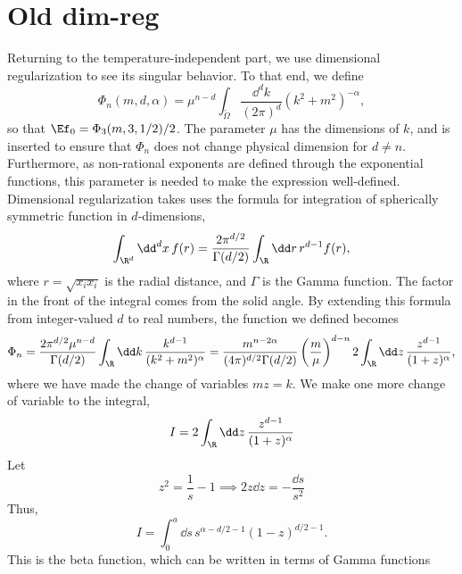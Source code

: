 \documentclass{article}
\begin{document}
\section{Old dim-reg}

Returning to the temperature-independent part, we use dimensional regularization to see its singular behavior.
To that end, we define
\begin{equation}
    \label{def dimreg integral}
    \Phi_n(m, d, \alpha) 
    = \mu^{n - d}\int_{\tilde \Omega} \frac{\dd^d k}{(2 \pi)^d} (k^2 + m^2)^{-\alpha},
\end{equation}
so that $\Ef_0 = \Phi_3(m, 3, 1/2) / 2$.
The parameter $\mu$ has the dimensions of $k$, and is inserted to ensure that $\Phi_n$ does not change physical dimension for $d \neq n$.
Furthermore, as non-rational exponents are defined through the exponential functions, this parameter is needed to make the expression well-defined.
Dimensional regularization takes uses the formula for integration of spherically symmetric function in $d$-dimensions,
\begin{equation}
    \int_{\R^d} \dd^d x \, f(r) 
    = \frac{2 \pi^{d/2}}{\Gamma(d/2)} \int_\R \dd r \, r^{d-1}f(r),
\end{equation}
where $r = \sqrt{x_i x_i}$ is the radial distance, and $\Gamma$ is the Gamma function.
The factor in the front of the integral comes from the solid angle.
By extending this formula from integer-valued $d$ to real numbers, the function we defined becomes
\begin{equation}
    \Phi_n
    = \frac{2 \pi^{d/2} \mu^{n - d} }{\Gamma(d/2)} \int_\R \dd k \, 
    \frac{k^{d-1}}{(k^2 + m^2)^\alpha}
    = \frac{m^{n-2\alpha}}{(4 \pi)^{d / 2}\Gamma(d/2)} 
    \left(\frac{m}{\mu}\right)^{d-n} 
    2 \int_\R \dd z \, \frac{z^{d - 1}}{(1 + z)^\alpha}, 
\end{equation}
where we have made the change of variables $m z = k$.
We make one more change of variable to the integral,
\begin{equation}
    I = 2 \int_\R \dd z \, \frac{z^{d - 1}}{(1 + z)^\alpha}
\end{equation}
Let
\begin{equation}
    z^2 = \frac{1}{s} - 1 \implies 2 z \dd z = - \frac{\dd s}{s^2}
\end{equation}
Thus,
\begin{equation}
    I = \int_0^a \dd s \, s^{\alpha - d/2 - 1} (1 - z)^{d/2 - 1}.
\end{equation}
This is the beta function, which can be written in terms of Gamma functions~\cite{Peskin:IntroQFT}
\end{document}
